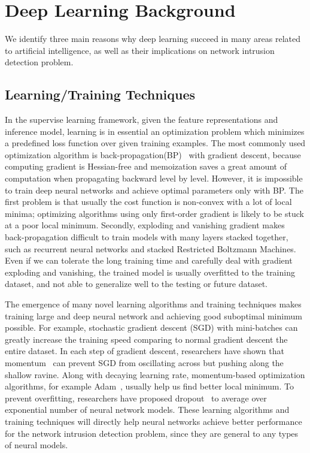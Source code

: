 \section{Deep Learning Background}
We identify three main reasons why deep learning succeed in many areas related
to artificial intelligence, as well as their implications on network intrusion detection problem.

\subsection{Learning/Training Techniques}
In the supervise learning framework, given the feature representations and inference model,
learning is in essential an optimization problem which minimizes a predefined loss function
over given training examples.
The most commonly used optimization algorithm is back-propagation(BP)~\cite{Backpropagation} with gradient descent,
because computing gradient is Hessian-free and memoization saves a great amount of computation when
propagating backward level by level.
However, it is impossible to train deep neural networks and achieve optimal parameters only with BP.
The first problem is that usually the cost function is non-convex with a lot of local minima;
optimizing algorithms using only first-order gradient is likely to be stuck at a poor local minimum.
Secondly, exploding and vanishing gradient makes back-propagation difficult to train models with many layers stacked together,
such as recurrent neural networks and stacked Restricted Boltzmann Machines.
Even if we can tolerate the long training time and carefully deal with gradient exploding and vanishing,
the trained model is usually overfitted to the training dataset, and not able to generalize well to the testing or future dataset.

The emergence of many novel learning algorithms and training techniques makes training large and deep
neural network and achieving good suboptimal minimum possible.
For example, stochastic gradient descent (SGD) with mini-batches can greatly increase the training speed comparing
to normal gradient descent the entire dataset.
In each step of gradient descent, researchers have shown that momentum~\cite{Momentum} can
prevent SGD from oscillating across but pushing along the shallow ravine.
Along with decaying learning rate, momentum-based optimization algorithms, for example Adam~\cite{Adam},
usually help us find better local minimum.
To prevent overfitting, researchers have proposed dropout~\cite{Dropout} to average over
exponential number of neural network models.
These learning algorithms and training techniques will directly help neural networks achieve
better performance for the network intrusion detection problem,
since they are general to any types of neural models.


